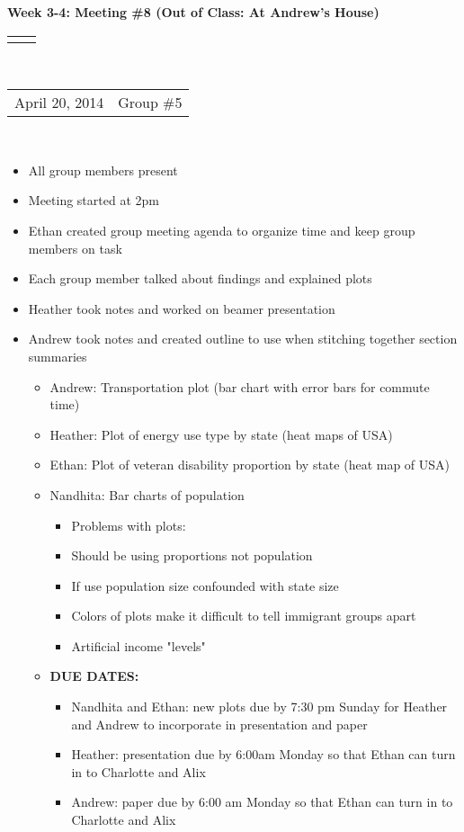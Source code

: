 \documentclass[12pt]{article}
\renewcommand{\title}[1]{\textbf{#1}\\}
\renewcommand{\line}{\begin{tabularx}{\textwidth}{X>{\raggedleft}X}\hline\\\end{tabularx}\\[-0.5cm]}
\newcommand{\leftright}[2]{\begin{tabularx}{\textwidth}{X>{\raggedleft}X}#1%
& #2\\\end{tabularx}\\[-0.5cm]}
\begin{document}
\title{Week 3-4: Meeting \#8 (Out of Class: At Andrew's House)}
\line
\leftright{April 20, 2014}{Group \#5} %
\vspace{5mm}


\begin{itemize}
\item All group members present 
\item Meeting started at 2pm 
\item Ethan created group meeting agenda to organize time and keep group members on task 
\item Each group member talked about findings and explained plots 
\item Heather took notes and worked on beamer presentation 
\item Andrew took notes and created outline to use when stitching together section summaries 

\begin{itemize}
\item Andrew: Transportation plot (bar chart with error bars for commute time)
\item Heather: Plot of energy use type by state (heat maps of USA)
\item Ethan: Plot of veteran disability proportion by state (heat map of USA)
\item Nandhita: Bar charts of population 
\begin{itemize}
\item Problems with plots: 
\item Should be using proportions not population 
\item If use population size confounded with state size 
\item Colors of plots make it difficult to tell immigrant groups apart 
\item Artificial income "levels"
\end{itemize}
\item \textbf{DUE DATES:}
\begin{itemize}
\item Nandhita and Ethan: new plots due by 7:30 pm Sunday for Heather and Andrew to incorporate in presentation and paper
\item Heather: presentation due by 6:00am Monday so that Ethan can turn in to Charlotte and Alix
\item Andrew: paper due by 6:00 am Monday so that Ethan can turn in to Charlotte and Alix
\end{itemize}
\end{itemize}
\end{itemize}
\end{document}
